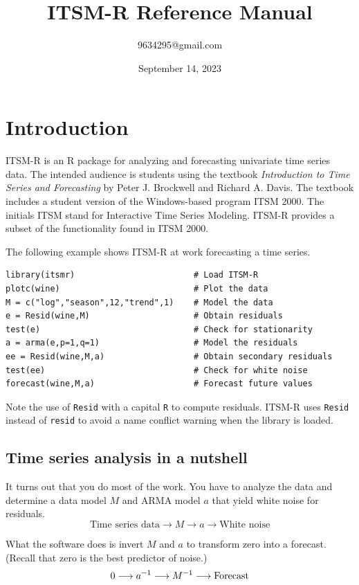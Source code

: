 \documentclass[12pt]{article}
\title{ITSM-R Reference Manual}
\author{9634295@gmail.com}
\date{September 14, 2023}
\begin{document}
\maketitle
\newpage
\tableofcontents
\newpage

\section{Introduction}
ITSM-R is an R package for analyzing and forecasting univariate
time series data.
The intended audience is students using the textbook
{\it Introduction to Time Series and Forecasting}
by Peter J. Brockwell and Richard A. Davis.
The textbook includes a student version of the Windows-based program ITSM 2000.
The initials ITSM stand for Interactive Time Series Modeling.
ITSM-R provides a subset of the functionality found in ITSM 2000.

\bigskip
The following example shows ITSM-R at work forecasting a time series.

\begin{verbatim}
library(itsmr)                        # Load ITSM-R
plotc(wine)                           # Plot the data
M = c("log","season",12,"trend",1)    # Model the data
e = Resid(wine,M)                     # Obtain residuals
test(e)                               # Check for stationarity
a = arma(e,p=1,q=1)                   # Model the residuals
ee = Resid(wine,M,a)                  # Obtain secondary residuals
test(ee)                              # Check for white noise
forecast(wine,M,a)                    # Forecast future values
\end{verbatim}

Note the use of {\tt Resid} with a capital {\tt R} to compute residuals.
ITSM-R uses {\tt Resid} instead of {\tt resid} to avoid a name conflict
warning when the library is loaded.

\subsection{Time series analysis in a nutshell}
It turns out that you do most of the work.
You have to analyze the data and
determine a data model $M$ and ARMA model $a$
that yield white noise for residuals.
\[
\text{Time series data}
\longrightarrow M\longrightarrow a\longrightarrow
\text{White noise}
\]

What the software does is invert $M$ and $a$ to transform zero into a forecast.
(Recall that zero is the best predictor of noise.)
\[
0\longrightarrow a^{-1}\longrightarrow M^{-1}\longrightarrow{\rm Forecast}
\]
\end{document}
